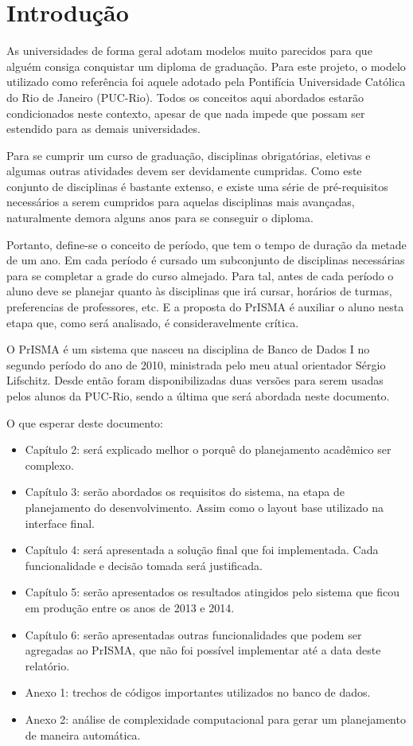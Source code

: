 \documentclass[graduacao,brazil]{ThesisPUC}
\begin{document}
\chapter{Introdução}

As universidades de forma geral adotam modelos muito parecidos para que alguém consiga conquistar um diploma de graduação. Para este projeto, o modelo utilizado como referência foi aquele adotado pela Pontifícia Universidade Católica do Rio de Janeiro (PUC-Rio). Todos os conceitos aqui abordados estarão condicionados neste contexto, apesar de que nada impede que possam ser estendido para as demais universidades. 

Para se cumprir um curso de graduação, disciplinas obrigatórias, eletivas e algumas outras atividades devem ser devidamente cumpridas. Como este conjunto de disciplinas é bastante extenso, e existe uma série de pré-requisitos necessários a serem cumpridos para aquelas disciplinas mais avançadas, naturalmente demora alguns anos para se conseguir o diploma. 

Portanto, define-se o conceito de período, que tem o tempo de duração da metade de um ano. Em cada período é cursado um subconjunto de disciplinas necessárias para se completar a grade do curso almejado. Para tal, antes de cada período o aluno deve se planejar quanto às disciplinas que irá cursar, horários de turmas, preferencias de professores, etc. E a proposta do PrISMA é auxiliar o aluno nesta etapa que, como será analisado, é consideravelmente crítica. 

O PrISMA é um sistema que nasceu na disciplina de Banco de Dados I no segundo período do ano de 2010, ministrada pelo meu atual orientador Sérgio Lifschitz. Desde então foram disponibilizadas duas versões para serem usadas pelos alunos da PUC-Rio, sendo a última que será abordada neste documento. 

O que esperar deste documento:

\begin{itemize}
	\item Capítulo 2: será explicado melhor o porquê do planejamento acadêmico ser complexo. 
	\item Capítulo 3: serão abordados os requisitos do sistema, na etapa de planejamento do desenvolvimento. Assim como o layout base utilizado na interface final. 
	\item Capítulo 4: será apresentada a solução final que foi implementada. Cada funcionalidade e decisão tomada será justificada. 
	\item Capítulo 5: serão apresentados os resultados atingidos pelo sistema que ficou em produção entre os anos de 2013 e 2014. 
	\item Capítulo 6: serão apresentadas outras funcionalidades que podem ser agregadas ao PrISMA, que não foi possível implementar até a data deste relatório.
	\item Anexo 1: trechos de códigos importantes utilizados no banco de dados. 
	\item Anexo 2: análise de complexidade computacional para gerar um planejamento de maneira automática.
\end{itemize}
\end{document}
